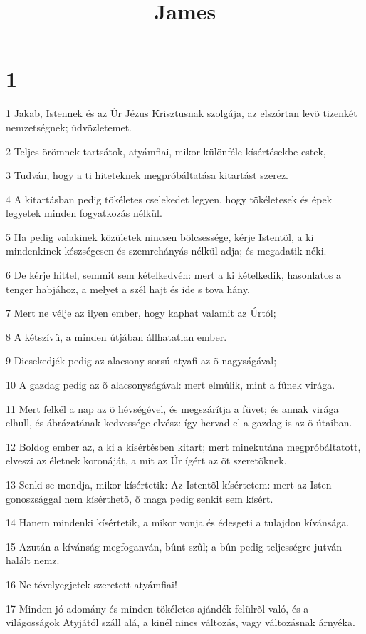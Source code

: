 

\title{James}


\chapter{1}

\par 1 Jakab, Istennek és az Úr Jézus Krisztusnak szolgája, az elszórtan levõ tizenkét nemzetségnek; üdvözletemet.
\par 2 Teljes örömnek tartsátok, atyámfiai, mikor különféle kísértésekbe estek,
\par 3 Tudván, hogy a ti hiteteknek megpróbáltatása kitartást szerez.
\par 4 A kitartásban pedig tökéletes cselekedet legyen, hogy tökéletesek és épek legyetek minden fogyatkozás nélkül.
\par 5 Ha pedig valakinek közületek nincsen bölcsessége, kérje  Istentõl, a ki mindenkinek készségesen és szemrehányás nélkül adja; és megadatik néki.
\par 6 De kérje hittel, semmit sem kételkedvén: mert a ki kételkedik, hasonlatos a tenger habjához, a melyet a szél hajt és ide s tova hány.
\par 7 Mert ne vélje az ilyen ember, hogy kaphat valamit az Úrtól;
\par 8 A kétszívû, a minden útjában állhatatlan ember.
\par 9 Dicsekedjék pedig az alacsony sorsú atyafi az õ nagyságával;
\par 10 A gazdag pedig az õ alacsonyságával: mert elmúlik, mint a fûnek virága.
\par 11 Mert felkél a nap az õ hévségével, és megszárítja a füvet; és annak virága elhull, és ábrázatának kedvessége elvész: így hervad el a  gazdag is az õ útaiban.
\par 12 Boldog ember az, a ki a kísértésben kitart; mert minekutána megpróbáltatott, elveszi az életnek koronáját, a mit az Úr ígért az õt szeretõknek.
\par 13 Senki se mondja, mikor kísértetik: Az Istentõl kísértetem: mert az Isten gonoszsággal nem kísérthetõ, õ maga pedig senkit sem kísért.
\par 14 Hanem mindenki kísértetik, a mikor vonja és édesgeti a tulajdon kívánsága.
\par 15 Azután a kívánság megfoganván, bûnt szûl; a bûn pedig teljességre jutván halált nemz.
\par 16 Ne tévelyegjetek szeretett atyámfiai!
\par 17 Minden jó adomány és minden tökéletes ajándék felülrõl való, és a világosságok Atyjától száll alá, a kinél nincs változás, vagy változásnak árnyéka.
